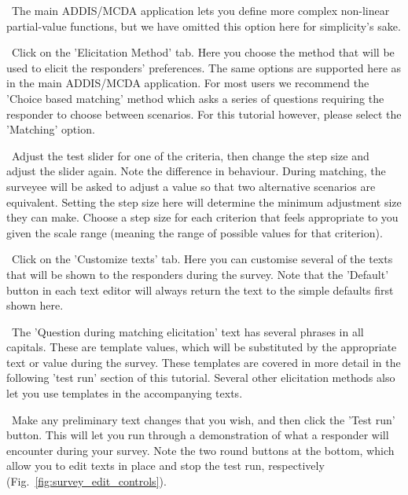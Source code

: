\documentclass[00_mcda_tutorial.tex]{subfiles}
\begin{document}
\begin{sidebar*}
\noindent \faLightbulbO \, The main ADDIS/MCDA application lets you define more complex non-linear partial-value functions, but we have omitted this option here for simplicity's sake.
\newline

\noindent \leftpointright \, Click on the 'Elicitation Method' tab. Here you choose the method that will be used to elicit the responders' preferences. The same options are supported here as in the main ADDIS/MCDA application. For most users we recommend the 'Choice based matching' method which asks a series of questions requiring the responder to choose between scenarios. For this tutorial however, please select the 'Matching' option.
\newline

\noindent \leftpointright \, Adjust the test slider for one of the criteria, then change the step size and adjust the slider again. Note the difference in behaviour. During matching, the surveyee will be asked to adjust a value so that two alternative scenarios are equivalent. Setting the step size here will determine the minimum adjustment size they can make. Choose a step size for each criterion that feels appropriate to you given the scale range (meaning the range of possible values for that criterion).
\newline

\noindent \leftpointright \, Click on the 'Customize texts' tab. Here you can customise several of the texts that will be shown to the responders during the survey. Note that the 'Default' button in each text editor will always return the text to the simple defaults first shown here.
\newline

\noindent \faLightbulbO \, The 'Question during matching elicitation' text has several phrases in all capitals. These are template values, which will be substituted by the appropriate text or value during the survey. These templates are covered in more detail in the following 'test run' section of this tutorial. Several other elicitation methods also let you use templates in the accompanying texts.
\newline

\noindent \leftpointright \, Make any preliminary text changes that you wish, and then click the 'Test run' button. This will let you run through a demonstration of what a responder will encounter during your survey. Note the two round buttons at the bottom, which allow you to edit texts in place and stop the test run, respectively (Fig.~\ref{fig:survey_edit_controls}).
\newline


\end{sidebar*}
\end{document}
